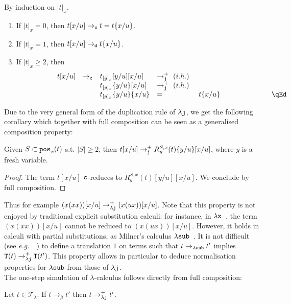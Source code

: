 \documentclass{LMCS}
\newcommand{\eg}{{\it  e.g.}~}
\renewcommand{\>}{\rightarrow}
\def\lam{\lambda}
\newcommand{\Rew}[1]{\rightarrow_{#1}}
\newcommand{\lx}{\lam{\tt x}}
\newcommand{\isubs}[1]{ \{ #1  \} }
\newcommand{\pos}[2]{{\tt pos}_{#1}(#2)}
\newcommand{\dis}{{\tt j}}
\newcommand{\ldis}{\lam{\dis}}
\newcommand{\ren}[4]{R^{#2, #3}_{#4}(#1)}
\newcommand{\Rewplus}[1]{\rightarrow^{+}_{#1}}
\newcommand{\Var}{{\tt d}}
\newcommand{\DSubs}{{\tt c}}
\newcommand{\Gc}{{\tt w}}
\newcommand{\set}[1]{ \{ #1 \}}
\newcommand{\ih}{i.h.}
\newcommand{\terms}{\mathcal{T}}
\newcommand{\termslambda}{\terms_{\lam}}
\newcommand{\lsub}{\lam {\tt sub}}
\begin{document}
\proof
By induction on $|t|_{x}$.
\begin{enumerate}[$\bullet$]
\item If $|t|_{x} = 0$, then $t[x/u] \Rew{\Gc} t = t\isubs{x/u}$.
\item If $|t|_{x} = 1$, then 
      $t[x/u] \Rew{\Var} t\isubs{x/u}$.
\item If $|t|_{x} \geq 2$, then 
\[ \begin{array}{llllll}
t[x/u] &\Rew{\DSubs}& t_{[y]_x}[y/u][x/u]&  \Rewplus{\dis}\ (\ih)\ \\
  & &t_{[y]_x}\isubs{y/u}[x/u]&\Rewplus{\dis}\ (\ih)\ \\
&  &t_{[y]_x}\isubs{y/u}\isubs{x/u} &=&   t\isubs{x/u}
  \rlap{\hbox to 93 pt{\hfill\qEd}}
  \end{array}   \]\bigskip
\end{enumerate}


Due to the very general form of the duplication rule
of $\ldis$, we get the following corollary which together with full composition can be seen as a generalised composition property: 

\begin{cor}
Given  $S \subset \pos{x}{t}$ s.t.  $|S| \geq 2$, then $t[x/u]
\Rewplus{\dis} \ren{t}{S}{x}{y} \set{y/u}[x/u]$, where $y$ is a
fresh variable. 
\end{cor}



\begin{proof}
The term $t[x/u]$  $\DSubs$-reduces to 
$\ren{t}{S}{x}{y}[y/u][x/u]$. We conclude
by full composition.
\end{proof}

 Thus for example $(x (x x))[x/u] \Rewplus{\ldis}
  (x (u x))[x/u]$.  Note that this property is not enjoyed by
  traditional explicit substitution calculi: for instance, in
  $\lx$~\cite{BlooRoselx}, the term $(x (x x))[x/u]$ cannot be reduced to
  $(x (u x))[x/u]$.  However, it holds in
  calculi with partial substitutions, as Milner's calculus $\lsub$~\cite{Milner07}. It is not
  difficult (see \eg~\cite{OConchuirKesner}) to define a translation
  {\tt T} on terms such that $t \Rew{\lsub} t'$ implies ${\tt T}(t)
  \Rewplus{\ldis} {\tt T}(t')$.  This property allows in particular to
  deduce normalisation properties for  $\lsub$ from those  of  $\ldis$.  \\

The one-step simulation of $\lam$-calculus follows directly from full composition:

\begin{lem}[Simulation of $\lam$-calculus]
\label{l:l-sim}
Let $t \in \termslambda$.  If $t\Rew{\beta} t'$ then  $t
\Rewplus{\ldis}  t'$.
\end{lem}
\end{document}
